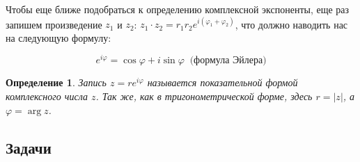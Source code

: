 \documentclass[a4paper,twocolumn,12pt]{article}			%
\newtheorem{definition}{Определение} %
\begin{document}
	Чтобы еще ближе подобраться к определению комплексной экспоненты, еще раз запишем произведение $z_1$ и $z_2$:
	\mbox{$z_1 \cdot z_2 = r_1r_2e^{i(\varphi_1 + \varphi_2)}$}, что должно наводить нас на следующую формулу:
	
	$$e^{i\varphi} = \cos\varphi + i \sin\varphi \ \textit{ (формула Эйлера)}$$
	
	\begin{definition}
		Запись $z = re^{i\varphi}$ называется показательной формой комплексного числа $z$. Так же, как в тригонометрической форме, здесь $r = |z|$, а $\varphi = \arg z$.
	\end{definition}
	
	\subsection{Задачи}
\end{document}
